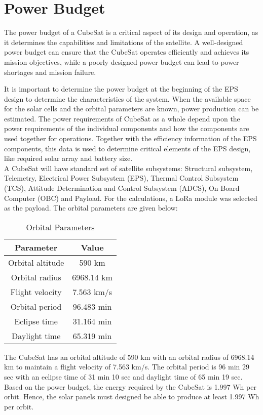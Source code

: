 \chapter{Power Budget}
\justifying
The power budget of a CubeSat is a critical aspect of its design and operation, as it determines the capabilities and limitations of the satellite. A well-designed power budget can ensure that the CubeSat operates efficiently and achieves its mission objectives, while a poorly designed power budget can lead to power shortages and mission failure.

 It is important to determine the power budget at the beginning of the EPS design to determine the characteristics of the system. When the available space for the solar cells and the orbital parameters are known, power production can be estimated.
 The power requirements of CubeSat as a whole depend upon the power requirements of the individual components and how the components are used together for operations. Together with the efficiency information of the EPS components, this data is used to determine critical elements of the EPS design, like required solar array and battery size.
 \\
 A CubeSat will have standard set of satellite subsystems: Structural subsystem, Telemetry, Electrical Power Subsystem (EPS), Thermal Control Subsystem (TCS), Attitude Determination and Control Subsystem (ADCS), On Board Computer (OBC) and Payload. For the calculations, a LoRa module was selected as the payload. The orbital parameters are given below:
 
\begin{table}[]
	\begin{center}
	\begin{tabular}{c c}
		\toprule
		\textbf{Parameter} & \textbf{Value} \\ \midrule\midrule
		Orbital altitude   & 590 km         \\ 
		Orbital radius     & 6968.14 km     \\ 
		Flight velocity    & 7.563 km/s     \\ 
		Orbital period     & 96.483 min     \\ 
		Eclipse time       & 31.164 min     \\ 
		Daylight time      & 65.319 min     \\ 
		\bottomrule
	\end{tabular}
\caption{Orbital Parameters}
\label{table:1}
\end{center}
\end{table}
 \pagebreak
The CubeSat has an orbital altitude of 590 km with an orbital radius of 6968.14 km to maintain a flight velocity of 7.563 km/s. The orbital period is 96 min 29 sec with an eclipse time of 31 min 10 sec and daylight time of 65 min 19 sec. Based on the power budget, the energy required by the CubeSat is 1.997 Wh per orbit. Hence, the solar panels must designed be able to produce at least 1.997 Wh per orbit.
 \\
 
